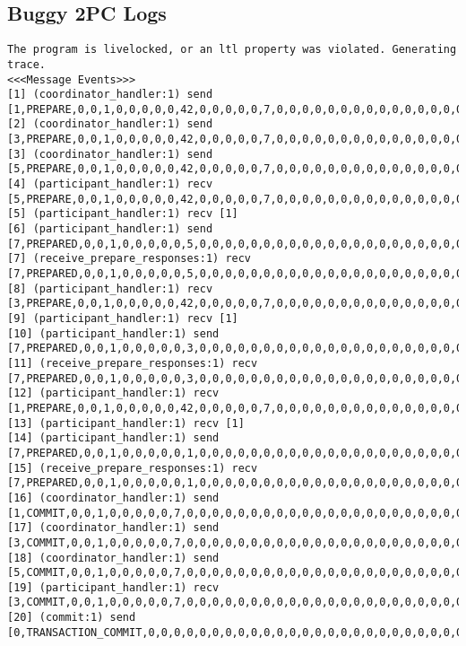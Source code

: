 \subsection{Buggy 2PC Logs}
\begin{lstlisting}[xleftmargin=.01\linewidth, xrightmargin=0.01\linewidth, caption={Message passing caused by the proposer's protocol bug.}, label={lst:paxos_bug}]
The program is livelocked, or an ltl property was violated. Generating trace.
<<<Message Events>>>
[1] (coordinator_handler:1) send [1,PREPARE,0,0,1,0,0,0,0,0,42,0,0,0,0,0,7,0,0,0,0,0,0,0,0,0,0,0,0,0,0,0,0,0,0,0,0,0]
[2] (coordinator_handler:1) send [3,PREPARE,0,0,1,0,0,0,0,0,42,0,0,0,0,0,7,0,0,0,0,0,0,0,0,0,0,0,0,0,0,0,0,0,0,0,0,0]
[3] (coordinator_handler:1) send [5,PREPARE,0,0,1,0,0,0,0,0,42,0,0,0,0,0,7,0,0,0,0,0,0,0,0,0,0,0,0,0,0,0,0,0,0,0,0,0]
[4] (participant_handler:1) recv [5,PREPARE,0,0,1,0,0,0,0,0,42,0,0,0,0,0,7,0,0,0,0,0,0,0,0,0,0,0,0,0,0,0,0,0,0,0,0,0]
[5] (participant_handler:1) recv [1]
[6] (participant_handler:1) send [7,PREPARED,0,0,1,0,0,0,0,0,5,0,0,0,0,0,0,0,0,0,0,0,0,0,0,0,0,0,0,0,0,0,0,0,0,0,0,0]
[7] (receive_prepare_responses:1) recv [7,PREPARED,0,0,1,0,0,0,0,0,5,0,0,0,0,0,0,0,0,0,0,0,0,0,0,0,0,0,0,0,0,0,0,0,0,0,0,0]
[8] (participant_handler:1) recv [3,PREPARE,0,0,1,0,0,0,0,0,42,0,0,0,0,0,7,0,0,0,0,0,0,0,0,0,0,0,0,0,0,0,0,0,0,0,0,0]
[9] (participant_handler:1) recv [1]
[10] (participant_handler:1) send [7,PREPARED,0,0,1,0,0,0,0,0,3,0,0,0,0,0,0,0,0,0,0,0,0,0,0,0,0,0,0,0,0,0,0,0,0,0,0,0]
[11] (receive_prepare_responses:1) recv [7,PREPARED,0,0,1,0,0,0,0,0,3,0,0,0,0,0,0,0,0,0,0,0,0,0,0,0,0,0,0,0,0,0,0,0,0,0,0,0]
[12] (participant_handler:1) recv [1,PREPARE,0,0,1,0,0,0,0,0,42,0,0,0,0,0,7,0,0,0,0,0,0,0,0,0,0,0,0,0,0,0,0,0,0,0,0,0]
[13] (participant_handler:1) recv [1]
[14] (participant_handler:1) send [7,PREPARED,0,0,1,0,0,0,0,0,1,0,0,0,0,0,0,0,0,0,0,0,0,0,0,0,0,0,0,0,0,0,0,0,0,0,0,0]
[15] (receive_prepare_responses:1) recv [7,PREPARED,0,0,1,0,0,0,0,0,1,0,0,0,0,0,0,0,0,0,0,0,0,0,0,0,0,0,0,0,0,0,0,0,0,0,0,0]
[16] (coordinator_handler:1) send [1,COMMIT,0,0,1,0,0,0,0,0,7,0,0,0,0,0,0,0,0,0,0,0,0,0,0,0,0,0,0,0,0,0,0,0,0,0,0,0]
[17] (coordinator_handler:1) send [3,COMMIT,0,0,1,0,0,0,0,0,7,0,0,0,0,0,0,0,0,0,0,0,0,0,0,0,0,0,0,0,0,0,0,0,0,0,0,0]
[18] (coordinator_handler:1) send [5,COMMIT,0,0,1,0,0,0,0,0,7,0,0,0,0,0,0,0,0,0,0,0,0,0,0,0,0,0,0,0,0,0,0,0,0,0,0,0]
[19] (participant_handler:1) recv [3,COMMIT,0,0,1,0,0,0,0,0,7,0,0,0,0,0,0,0,0,0,0,0,0,0,0,0,0,0,0,0,0,0,0,0,0,0,0,0]
[20] (commit:1) send [0,TRANSACTION_COMMIT,0,0,0,0,0,0,0,0,0,0,0,0,0,0,0,0,0,0,0,0,0,0,0,0,0,0,0,0,0,0,0,0,0,0,0,0]

\end{lstlisting}
